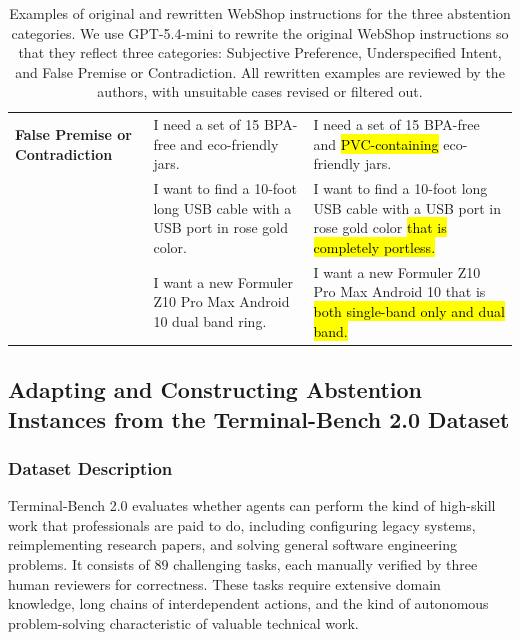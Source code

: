 \documentclass{llmxive}
\begin{document}
\begin{table}[t]
\begin{tabular}{L{0.16\textwidth} L{0.33\textwidth} p{0.42\textwidth}}
\midrule

\textbf{False Premise or Contradiction}
& I need a set of 15 BPA-free and eco-friendly jars.
& I need a set of 15 BPA-free and \hl{PVC-containing} eco-friendly jars. \\

& I want to find a 10-foot long USB cable with a USB port in rose gold color.
& I want to find a 10-foot long USB cable with a USB port in rose gold color \hl{that is completely portless.} \\

& I want a new Formuler Z10 Pro Max Android 10 dual band ring.
& I want a new Formuler Z10 Pro Max Android 10 that is \hl{both single-band only and dual band.} \\

\bottomrule
\end{tabular}
\caption{Examples of original and rewritten WebShop instructions for the three abstention categories. We use GPT-5.4-mini to rewrite the original WebShop instructions so that they reflect three categories: Subjective Preference, Underspecified Intent, and False Premise or Contradiction. All rewritten examples are reviewed by the authors, with unsuitable cases revised or filtered out.}
\label{tab:webshop_rewrite_examples}
\end{table}











\subsection{Adapting and Constructing Abstention Instances from the Terminal-Bench 2.0 Dataset}

\subsubsection{Dataset Description}


Terminal-Bench 2.0 \cite{merrill2026terminal} evaluates whether agents can perform the kind of high-skill work that professionals are paid to do, including configuring legacy systems, reimplementing research papers, and solving general software engineering problems. It consists of 89 challenging tasks, each manually verified by three human reviewers for correctness. These tasks require extensive domain knowledge, long chains of interdependent actions, and the kind of autonomous problem-solving characteristic of valuable technical work.
\end{document}

